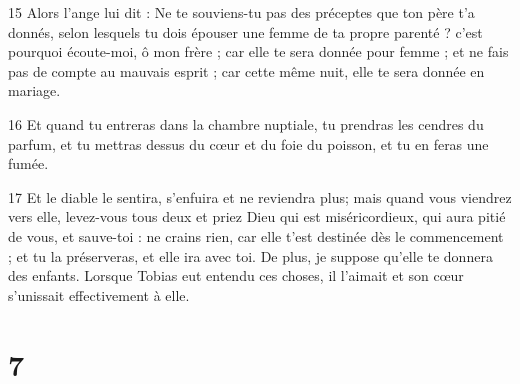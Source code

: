 \par 15 Alors l'ange lui dit : Ne te souviens-tu pas des préceptes que ton père t'a donnés, selon lesquels tu dois épouser une femme de ta propre parenté ? c’est pourquoi écoute-moi, ô mon frère ; car elle te sera donnée pour femme ; et ne fais pas de compte au mauvais esprit ; car cette même nuit, elle te sera donnée en mariage.
\par 16 Et quand tu entreras dans la chambre nuptiale, tu prendras les cendres du parfum, et tu mettras dessus du cœur et du foie du poisson, et tu en feras une fumée.
\par 17 Et le diable le sentira, s'enfuira et ne reviendra plus; mais quand vous viendrez vers elle, levez-vous tous deux et priez Dieu qui est miséricordieux, qui aura pitié de vous, et sauve-toi : ne crains rien, car elle t'est destinée dès le commencement ; et tu la préserveras, et elle ira avec toi. De plus, je suppose qu'elle te donnera des enfants. Lorsque Tobias eut entendu ces choses, il l'aimait et son cœur s'unissait effectivement à elle.

\chapter{7}

